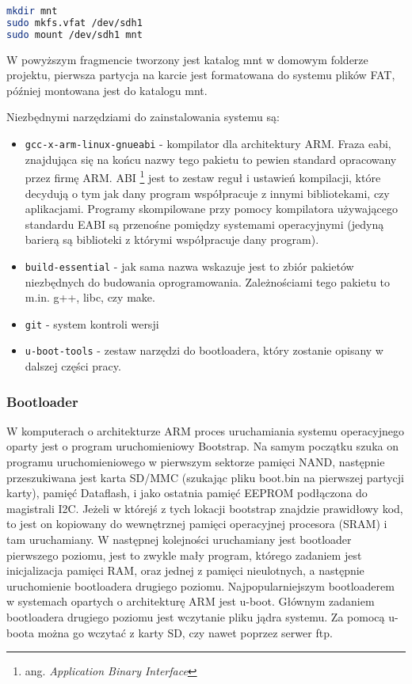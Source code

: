 \begin{lstlisting}[language=bash]
mkdir mnt
sudo mkfs.vfat /dev/sdh1
sudo mount /dev/sdh1 mnt
\end{lstlisting}

W powyższym fragmencie tworzony jest katalog mnt w domowym folderze projektu, pierwsza partycja na karcie jest formatowana do systemu plików FAT, później montowana jest do katalogu mnt.


Niezbędnymi narzędziami do zainstalowania systemu są:
\begin{itemize}
	\item {\lstinline{gcc-x-arm-linux-gnueabi}}  - kompilator dla architektury ARM. Fraza eabi, znajdująca się na końcu nazwy tego pakietu to pewien standard opracowany przez firmę ARM. ABI  \footnote{ang. \emph{Application Binary Interface}} jest to zestaw reguł i ustawień kompilacji, które decydują o tym jak dany program współpracuje z innymi bibliotekami, czy aplikacjami. Programy skompilowane przy pomocy kompilatora używającego standardu EABI są przenośne pomiędzy systemami operacyjnymi (jedyną barierą są biblioteki z którymi współpracuje dany program).
	\item {\lstinline{build-essential}} - jak sama nazwa wskazuje jest to zbiór pakietów niezbędnych do budowania oprogramowania. Zależnościami tego pakietu to m.in. g++, libc, czy make.
	\item {\lstinline{git}} - system kontroli wersji
	\item {\lstinline{u-boot-tools}} - zestaw narzędzi do bootloadera, który zostanie opisany w dalszej części pracy.
\end{itemize}


\subsubsection{Bootloader}

W komputerach o architekturze ARM proces uruchamiania systemu operacyjnego oparty jest o program uruchomieniowy Bootstrap. Na samym początku szuka on programu uruchomieniowego w pierwszym sektorze pamięci NAND, następnie przeszukiwana jest karta SD/MMC (szukając pliku boot.bin na pierwszej partycji karty), pamięć Dataflash, i jako ostatnia pamięć EEPROM podłączona do magistrali I2C. Jeżeli w którejś z tych lokacji bootstrap znajdzie prawidłowy kod, to jest on kopiowany do wewnętrznej pamięci operacyjnej procesora (SRAM) i tam uruchamiany. W następnej kolejności uruchamiany jest bootloader pierwszego poziomu, jest to zwykle mały program, którego zadaniem jest inicjalizacja pamięci RAM, oraz jednej z pamięci nieulotnych, a następnie uruchomienie bootloadera drugiego poziomu.
Najpopularniejszym bootloaderem w systemach opartych o architekturę ARM jest u-boot. Głównym zadaniem bootloadera drugiego poziomu jest wczytanie pliku jądra systemu. Za pomocą u-boota można go wczytać z karty SD, czy nawet poprzez serwer ftp.

